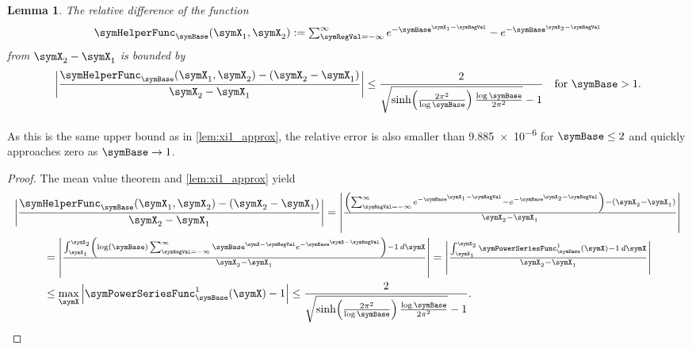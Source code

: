 \documentclass[sigconf, nonacm]{acmart}
\newtheorem{lemma}{Lemma}
\begin{document}
\begin{lemma}
\label{lem:zeta_approx}
The relative difference of the function
\begin{equation*}
\symHelperFunc_\symBase(\symX_1,\symX_2):={\textstyle\sum_{\symRegVal=-\infty}^\infty e^{-\symBase^{\symX_1-\symRegVal}} - e^{-\symBase^{\symX_2-\symRegVal}}}
\end{equation*}
from $\symX_2-\symX_1$ is bounded by
\begin{equation*}
\left|\frac{\symHelperFunc_\symBase(\symX_1,\symX_2) - (\symX_2 - \symX_1)}{\symX_2 - \symX_1}\right|\leq
\frac{2}{\sqrt{
\sinh\!\left(\frac{2\pi^2}{\log \symBase}\right)
\frac{\log \symBase}{2\pi^2}
}
-1
}
\quad
\textnormal{for $\symBase>1$}.
\end{equation*}
\end{lemma}
As this is the same upper bound as in \cref{lem:xi1_approx}, the relative error is also smaller than \num{9.885e-6} for $\symBase\leq 2$ and quickly approaches zero as $\symBase\rightarrow 1$.
\begin{proof}
The mean value theorem and \cref{lem:xi1_approx} yield
\begin{multline*}
\left|\frac{\symHelperFunc_\symBase(\symX_1,\symX_2) - (\symX_2 - \symX_1)}{\symX_2 - \symX_1}\right|
=
{\textstyle\left|\frac{\left(\sum_{\symRegVal=-\infty}^\infty e^{-\symBase^{\symX_1-\symRegVal}} - e^{-\symBase^{\symX_2-\symRegVal}}\right) - (\symX_2 - \symX_1)}{\symX_2 - \symX_1}\right|}
\\
\begin{aligned}
&=
{\textstyle\left|\frac{\int_{\symX_1}^{\symX_2}
\left(
\log(\symBase) \sum_{\symRegVal = -\infty}^\infty
\symBase^{\symX-\symRegVal}
e^{-\symBase^{\symX-\symRegVal}}
\right)
-1\,d\symX}{\symX_2 - \symX_1}\right|}
=
{\textstyle\left|\frac{\int_{\symX_1}^{\symX_2}
\symPowerSeriesFunc_\symBase^1(\symX)-1\,d\symX}{\symX_2 - \symX_1}\right|}
\\
&\leq
\max_\symX
\left|\symPowerSeriesFunc_\symBase^1(\symX)-1\right|
\leq
\frac{2}{\sqrt{
\sinh\!\left(\frac{2\pi^2}{\log \symBase}\right)
\frac{\log \symBase}{2\pi^2}
}
-1
}.
\end{aligned}
\end{multline*}
\end{proof}
\end{document}
